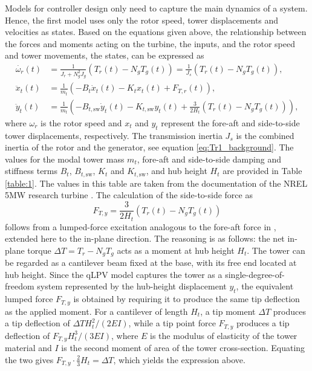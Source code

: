Models for controller design only need to capture the main dynamics of a system. Hence, the first model uses only the rotor speed, tower displacements and velocities as states. Based on the equations given above, the relationship between the forces and moments acting on the turbine, the inputs, and the rotor speed and tower movements, the states, can be expressed as
\begin{equation}\label{eq:Mdl1NonLin}
    \begin{split} 
        \dot{\omega_r}(t) &= \frac{1}{J_r + N_g^2 J_g}(T_r(t) - N_{g}T_{g}(t)) = \frac{1}{J_s}(T_r(t) - N_{g}T_{g}(t)),   \\
        \ddot{x}_{t}(t) & = \frac{1}{m_{t}}(-B_{t}\dot{x}_{t}(t) - K_{t}{x}_{t}(t) + F_{T,r}(t)), \\
        \ddot{y}_{t}(t) &= \frac{1}{m_{t}}(-B_{t,\text{sw}} \dot{y}_{t}(t) - K_{t,\text{sw}}{y}_{t}(t)  + \frac{3}{2H_t}(T_r(t) - N_gT_g(t))),       
    \end{split}
\end{equation}
where $\omega_r$ is the rotor speed and $x_t$ and $y_t$ represent the fore-aft and side-to-side tower displacements, respectively. The transmission inertia $J_s$ is the combined inertia of the rotor and the generator, see equation \ref{eq:Tr1_background}. The values for the modal tower mass $m_{t}$, fore-aft and side-to-side damping and stiffness terms  $B_t$, $B_{t,\text{sw}}$, $K_t$ and $K_{t,\text{sw}}$, and hub height $H_t$ are provided in Table \ref{table:1}. The values in this table are taken from the documentation of the NREL 5MW research turbine \cite{jonkman2009definition}. 
The calculation of the side-to-side force as
\begin{equation}
    F_{T,y} = \frac{3}{2H_t}(T_r(t) - N_gT_g(t))
\end{equation}
follows from a lumped-force excitation analogous to the fore-aft force in \cite{Bianchi2007}, extended here to the in-plane direction. The reasoning is as follows: the net in-plane torque $\Delta T = T_r - N_g T_g$ acts as a moment at hub height $H_t$. The tower can be regarded as a cantilever beam fixed at the base, with its free end located at hub height. Since the qLPV model captures the tower as a single-degree-of-freedom system represented by the hub-height displacement $y_t$, the equivalent lumped force $F_{T,y}$ is obtained by requiring it to produce the same tip deflection as the applied moment. For a cantilever of length $H_t$, a tip moment $\Delta T$ produces a tip deflection of $\Delta T H_t^2/(2EI)$, while a tip point force $F_{T,y}$ produces a tip deflection of $F_{T,y} H_t^3/(3EI)$,  where $E$ is the modulus of elasticity of the tower material and $I$ is the second moment of area of the tower cross-section. Equating the two gives $F_{T,y}\cdot\tfrac{2}{3}H_t = \Delta T$, which yields the expression above. 
